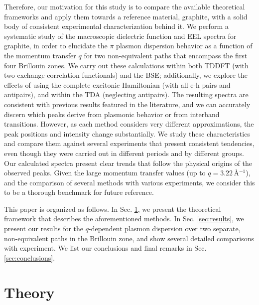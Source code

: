 \documentclass[aps,prb,10pt,showpacs,superscriptaddress,twocolumn,notitlepage]{revtex4-1}
\begin{document}
Therefore, our motivation for this study is to compare the available theoretical
frameworks and apply them towards a reference material, graphite, with a solid
body of consistent experimental characterization behind it.
We perform a systematic study of the macroscopic dielectric function and EEL
spectra for graphite, in order to elucidate the $\pi$ plasmon dispersion
behavior as a function of the momentum transfer $q$
for two non-equivalent paths that encompass the first four Brillouin zones. We
carry out these calculations within both TDDFT (with two exchange-correlation
functionals) and the BSE; additionally, we explore the effects of using the
complete excitonic Hamiltonian (with all e-h pairs and antipairs), and within
the TDA (neglecting antipairs). The resulting spectra are consistent with
previous results featured in the literature, and we can accurately discern which
peaks derive from plasmonic behavior or from interband transitions. However, as
each method considers very different approximations, the peak positions and
intensity change substantially. We study these characteristics and compare them
against several experiments that present consistent tendencies, even though they
were carried out in different periods and by different groups. Our calculated
spectra present clear trends that follow the physical origins of the observed
peaks. Given the large momentum transfer values (up
to $q = 3.22$\,\r{A}$^{-1}$), and the comparison of several methods with various
experiments, we consider this to be a thorough benchmark for future reference.

This paper is organized as follows. In Sec. \ref{sec:theory}, we present the
theoretical framework that describes the aforementioned methods. In Sec.
\ref{sec:results}, we present our results for the $q$-dependent plasmon
dispersion over two separate, non-equivalent paths in the Brillouin zone, and
show several detailed comparisons with experiment. We list our conclusions and
final remarks in Sec. \ref{sec:conclusions}.


\section{Theory}\label{sec:theory}
\end{document}
